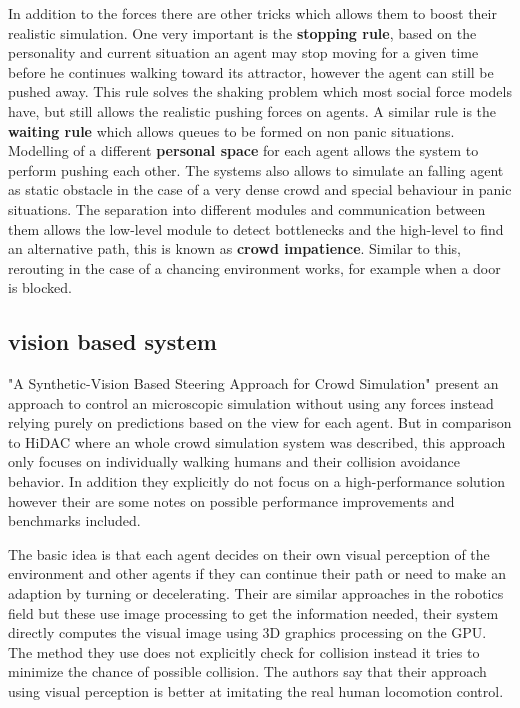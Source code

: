 \documentclass[sigconf]{acmart}
\begin{document}
In addition to the forces there are other tricks which allows them to boost their realistic simulation. 
One very important is the \textbf{stopping rule}, based on the personality and current situation an agent may stop moving for a given time before he continues walking toward its attractor, however the agent can still be pushed away. This rule solves the shaking problem which most social force models have, but still allows the realistic pushing forces on agents. 
A similar rule is the \textbf{waiting rule} which allows queues to be formed on non panic situations. Modelling of a different \textbf{personal space} for each agent allows the system to perform pushing each other. 
The systems also allows to simulate an falling agent as static obstacle in the case of a very dense crowd and special behaviour in panic situations. 
The separation into different modules and communication between them allows the low-level module to detect bottlenecks and the high-level to find an alternative path, this is known as \textbf{crowd impatience}. Similar to this, rerouting in the case of a chancing environment works, for example when a door is blocked.

\subsection{vision based system}

"A Synthetic-Vision Based Steering Approach for Crowd Simulation" \cite{ondrej_synthetic-vision_2010} present an approach to control an microscopic simulation without using any forces instead relying purely on predictions based on the view for each agent.
But in comparison to HiDAC where an whole crowd simulation system was described, this approach only focuses on individually walking humans and their collision avoidance behavior. In addition they explicitly do not focus on a high-performance solution however their are some notes on possible performance improvements and benchmarks included. 

The basic idea is that each agent decides on their own visual perception of the environment and other agents if they can continue their path or need to make an adaption by turning or decelerating. Their are similar approaches in the robotics field but these use image processing to get the information needed, their system directly computes the visual image using 3D graphics processing on the GPU.
The method they use does not explicitly check for collision instead it tries to minimize the chance of possible collision. The authors say that their approach using visual perception is better at imitating the real human locomotion control.
\end{document}
